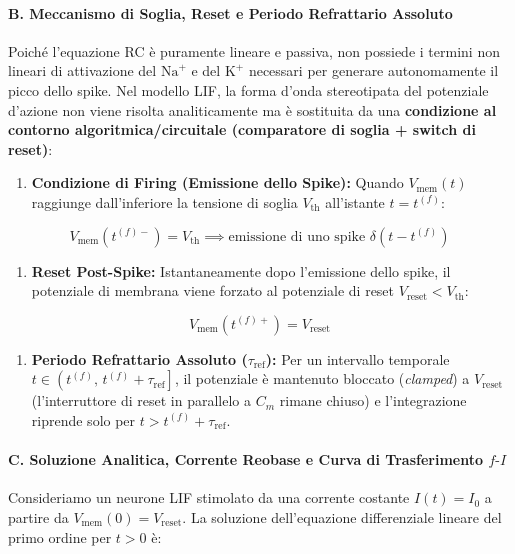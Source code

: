 \documentclass[11pt,a4paper]{article}
\begin{document}
\paragraph{B. Meccanismo di Soglia, Reset e Periodo Refrattario Assoluto}
Poiché l'equazione RC è puramente lineare e passiva, non possiede i termini non lineari di attivazione del $\text{Na}^+$ e del $\text{K}^+$ necessari per generare autonomamente il picco dello spike. Nel modello LIF, la forma d'onda stereotipata del potenziale d'azione non viene risolta analiticamente ma è sostituita da una \textbf{condizione al contorno algoritmica/circuitale (comparatore di soglia + switch di reset)}:

\begin{enumerate}
  \item \textbf{Condizione di Firing (Emissione dello Spike):} Quando $V_{\text{mem}}(t)$ raggiunge dall'inferiore la tensione di soglia $V_{\text{th}}$ all'istante $t = t^{(f)}$:
\end{enumerate}
\[
V_{\text{mem}}\left(t^{(f)-}\right) = V_{\text{th}} \implies \text{emissione di uno spike } \delta\left(t - t^{(f)}\right)
\]
\begin{enumerate}
  \item \textbf{Reset Post-Spike:} Istantaneamente dopo l'emissione dello spike, il potenziale di membrana viene forzato al potenziale di reset $V_{\text{reset}} < V_{\text{th}}$:
\end{enumerate}
\[
V_{\text{mem}}\left(t^{(f)+}\right) = V_{\text{reset}}
\]
\begin{enumerate}
  \item \textbf{Periodo Refrattario Assoluto ($\tau_{\text{ref}}$):} Per un intervallo temporale $t \in \left(t^{(f)},\, t^{(f)} + \tau_{\text{ref}}\right]$, il potenziale è mantenuto bloccato (\textit{clamped}) a $V_{\text{reset}}$ (l'interruttore di reset in parallelo a $C_m$ rimane chiuso) e l'integrazione riprende solo per $t > t^{(f)} + \tau_{\text{ref}}$.
\end{enumerate}

\paragraph{C. Soluzione Analitica, Corrente Reobase e Curva di Trasferimento $f\text{-}I$}
Consideriamo un neurone LIF stimolato da una corrente costante $I(t) = I_0$ a partire da $V_{\text{mem}}(0) = V_{\text{reset}}$. La soluzione dell'equazione differenziale lineare del primo ordine per $t > 0$ è:
\end{document}
